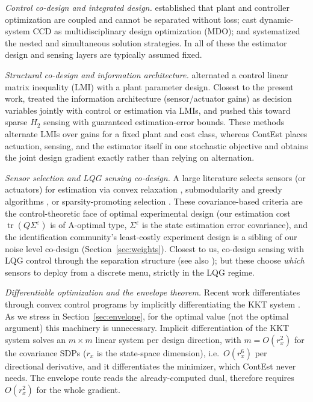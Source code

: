 \documentclass[twocolumn,amsthm]{autart}
\begin{document}
\emph{Control co-design and integrated design.}
\cite{fathy2001coupling} established that plant and controller optimization are
coupled and cannot be separated without loss; \cite{allison2014multidisciplinary}
cast dynamic-system CCD as multidisciplinary design optimization (MDO); and
\cite{herber2019nested} systematized the nested and simultaneous solution
strategies. In all of these the estimator design and sensing layers are typically assumed fixed.

\emph{Structural co-design and information architecture.}
\cite{grigoriadis1998integrate} alternated a control linear matrix inequality (LMI) with a plant parameter design. Closest to the present work, \cite{li2008integrating} treated the information architecture (sensor/actuator gains) as decision variables jointly with control or estimation via LMIs, and \cite{saraf2017h2,das2017sparse} pushed this toward sparse $H_2$ sensing with guaranteed estimation-error bounds. These methods alternate LMIs over gains for a fixed plant and cost class, whereas ContEst places actuation, sensing, and the estimator itself in one stochastic objective and obtains the joint design gradient exactly rather than relying on alternation.

\emph{Sensor selection and LQG sensing co-design.}
A large literature selects sensors (or actuators) for estimation via
convex relaxation \cite{joshi2009sensor}, submodularity and greedy algorithms
\cite{tzoumas2016sensor,zhang2017sensor}, or sparsity-promoting selection
\cite{dhingra2014admm}. These covariance-based criteria are the control-theoretic
face of optimal experimental design (our estimation cost
$\operatorname{tr}(Q\Sigma^\varepsilon)$ is of A-optimal type, $\Sigma^\varepsilon$ is the state estimation error covariance), and the
identification community's least-costly experiment design
\cite{gevers2005identification} is a sibling of our noise level
co-design (Section~\ref{sec:weights}).
Closest to us, \cite{tzoumas2021lqg} co-design sensing with LQG control through
the separation structure (see also \cite{siami2021separation,zardini2021codesign});
but these choose \emph{which} sensors to deploy from a discrete menu, strictly in the
LQG regime.


\emph{Differentiable optimization and the envelope theorem.}
Recent work differentiates through convex control programs by implicitly differentiating the KKT system \cite{amos2017optnet,agrawal2019differentiable}. As we stress in
Section~\ref{sec:envelope}, for the optimal value (not the optimal argument) this machinery is unnecessary. Implicit differentiation of the KKT system solves an $m\times m$ linear system per design
direction, with $m=O(r_x^2)$ for the covariance SDPs ($r_x$ is the state-space dimension), i.e.\ $O(r_x^6)$ per
directional derivative, and it differentiates the minimizer, which ContEst
never needs. The envelope route reads the already-computed dual, therefore requires $O(r_x^2)$ for the whole gradient.
\end{document}
